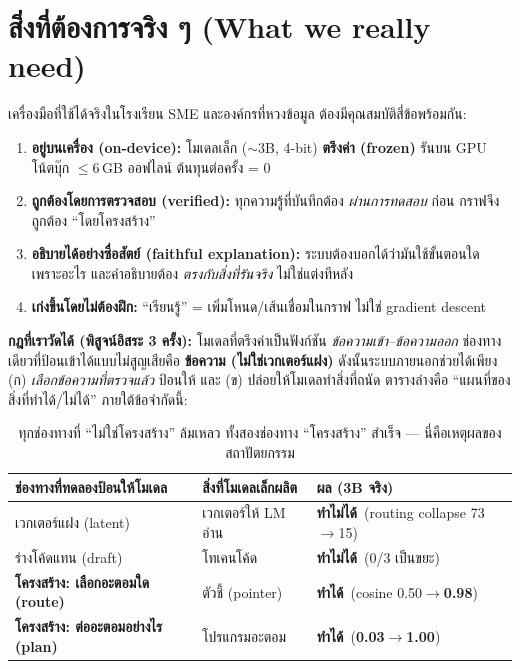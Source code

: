 \documentclass[fontsize=16pt,a4paper]{scrartcl}
\newcommand{\can}{\textcolor{ng}{\textbf{ทำได้}}}
\newcommand{\cant}{\textcolor{nr}{\textbf{ทำไม่ได้}}}
\begin{document}
\section{สิ่งที่ต้องการจริง ๆ (What we really need)}
เครื่องมือที่ใช้ได้จริงในโรงเรียน SME และองค์กรที่หวงข้อมูล ต้องมีคุณสมบัติสี่ข้อพร้อมกัน:
\begin{enumerate}
\item \textbf{อยู่บนเครื่อง (on-device):} โมเดลเล็ก ($\sim$3B, 4-bit) \textbf{ตรึงค่า (frozen)} รันบน GPU โน้ตบุ๊ก $\le$6\,GB ออฟไลน์ ต้นทุนต่อครั้ง = 0
\item \textbf{ถูกต้องโดยการตรวจสอบ (verified):} ทุกความรู้ที่บันทึกต้อง \emph{ผ่านการทดสอบ} ก่อน กราฟจึงถูกต้อง ``โดยโครงสร้าง''
\item \textbf{อธิบายได้อย่างซื่อสัตย์ (faithful explanation):} ระบบต้องบอกได้ว่ามันใช้ขั้นตอนใด เพราะอะไร และคำอธิบายต้อง \emph{ตรงกับสิ่งที่รันจริง} ไม่ใช่แต่งทีหลัง
\item \textbf{เก่งขึ้นโดยไม่ต้องฝึก:} ``เรียนรู้'' = เพิ่มโหนด/เส้นเชื่อมในกราฟ ไม่ใช่ gradient descent
\end{enumerate}

\noindent\textbf{กฎที่เราวัดได้ (พิสูจน์อิสระ 3 ครั้ง):} โมเดลที่ตรึงค่าเป็นฟังก์ชัน \emph{ข้อความเข้า--ข้อความออก} ช่องทางเดียวที่ป้อนเข้าได้แบบไม่สูญเสียคือ \textbf{ข้อความ (ไม่ใช่เวกเตอร์แฝง)} ดังนั้นระบบภายนอกช่วยได้เพียง (ก) \emph{เลือกข้อความที่ตรวจแล้ว} ป้อนให้ และ (ข) ปล่อยให้โมเดลทำสิ่งที่ถนัด ตารางล่างคือ ``แผนที่ของสิ่งที่ทำได้/ไม่ได้'' ภายใต้ข้อจำกัดนี้:

\begin{table}[H]\centering\small
\begin{tabular}{@{}>{\raggedright\arraybackslash}p{5.9cm}>{\raggedright\arraybackslash}p{4.5cm}>{\raggedright\arraybackslash}p{4.5cm}@{}}
\toprule
\textbf{ช่องทางที่ทดลองป้อนให้โมเดล} & \textbf{สิ่งที่โมเดลเล็กผลิต} & \textbf{ผล (3B จริง)}\\
\midrule
เวกเตอร์แฝง (latent) & เวกเตอร์ให้ LM อ่าน & \cant\ (routing collapse 73$\to$15)\\
ร่างโค้ดแทน (draft) & โทเคนโค้ด & \cant\ (0/3 เป็นขยะ)\\
\textbf{โครงสร้าง: เลือกอะตอมใด (route)} & ตัวชี้ (pointer) & \can\ (cosine 0.50$\to$\textbf{0.98})\\
\textbf{โครงสร้าง: ต่ออะตอมอย่างไร (plan)} & โปรแกรมอะตอม & \can\ (\textbf{0.03$\to$1.00})\\
\bottomrule
\end{tabular}
\caption{ทุกช่องทางที่ ``ไม่ใช่โครงสร้าง'' ล้มเหลว ทั้งสองช่องทาง ``โครงสร้าง'' สำเร็จ --- นี่คือเหตุผลของสถาปัตยกรรม}
\end{table}
\end{document}
